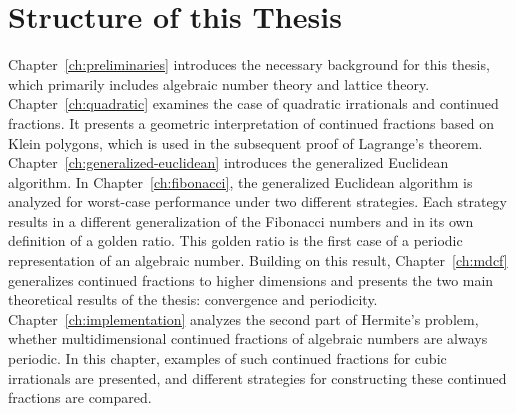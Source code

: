 \section{Structure of this Thesis}
\label{sec:structure}

Chapter~\ref{ch:preliminaries} introduces the necessary background for this thesis,
which primarily includes algebraic number theory and lattice theory.
Chapter~\ref{ch:quadratic} examines the case of quadratic irrationals and continued fractions.
It presents a geometric interpretation of continued fractions based on Klein polygons,
which is used in the subsequent proof of Lagrange's theorem.
Chapter~\ref{ch:generalized-euclidean} introduces the generalized Euclidean algorithm.
In Chapter~\ref{ch:fibonacci}, the generalized Euclidean algorithm is analyzed
for worst-case performance under two different strategies.
Each strategy results in a different generalization of the Fibonacci numbers
and in its own definition of a golden ratio.
This golden ratio is the first case of a periodic representation of an algebraic number.
Building on this result, Chapter~\ref{ch:mdcf} generalizes continued fractions to higher dimensions
and presents the two main theoretical results of the thesis: convergence and periodicity.
Chapter~\ref{ch:implementation} analyzes the second part of Hermite's problem,
whether multidimensional continued fractions of algebraic numbers are always periodic.
In this chapter, examples of such continued fractions for cubic irrationals are presented,
and different strategies for constructing these continued fractions are compared.
